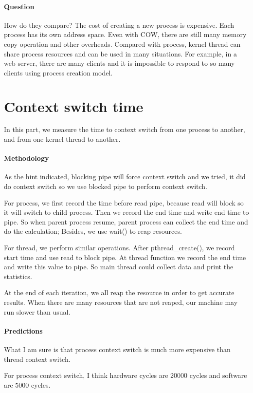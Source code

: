 \paragraph{Question} How do they compare?
The cost of creating a new process is expensive. Each process has its own address space. Even with COW, there are still many memory copy operation and other overheads. Compared with process, kernel thread can share process resources and can be used in many situations. For example, in a web server, there are many clients and it is impossible to respond to so many clients using process creation model.

\section{Context switch time}
In this part, we measure the time to context switch from one process to another, and from one kernel thread to another.

\paragraph{Methodology}
As the hint indicated, blocking pipe will force context switch and we tried, it did do context switch so we use blocked pipe to perform context switch.

For process, we first record the time before read pipe, because read will block so it will switch to child process. Then we record the end time and write end time to pipe. So when parent process resume, parent process can collect the end time and do the calculation; Besides, we use wait() to reap resources.

For thread, we perform similar operations. After pthread\_create(), we record start time and use read to block pipe. At thread function we record the end time and write this value to pipe. So main thread could collect data and print the statistics.

At the end of each iteration, we all reap the resource in order to get accurate results. When there are many resources that are not reaped, our machine may run slower than usual.

\paragraph{Predictions}
What I am sure is that process context switch is much more expensive than thread context switch.

For process context switch, I think hardware cycles are 20000 cycles and software are 5000 cycles.

